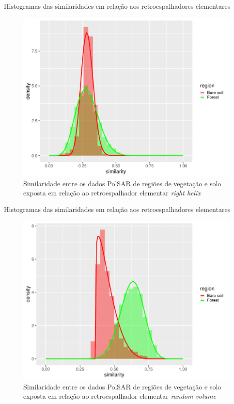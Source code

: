 \documentclass[10pt]{beamer}
\begin{document}
\begin{frame}{Histogramas das similaridades em relação aos retroespalhadores elementares}

\begin{figure}
    \centering
    \includegraphics[width = .6\linewidth]{rh.pdf}
    \caption{Similaridade entre os dados PolSAR de regiões de vegetação e solo exposta em relação ao retroespalhador elementar \textit{right helix}}
    \label{fig:rh}
\end{figure}
    
\end{frame}

\begin{frame}{Histogramas das similaridades em relação aos retroespalhadores elementares}

\begin{figure}
    \centering
    \includegraphics[width = .6\linewidth]{rv.pdf}
    \caption{Similaridade entre os dados PolSAR de regiões de vegetação e solo exposta em relação ao retroespalhador elementar \textit{random volume}}
    \label{fig:rv}
\end{figure}
    
\end{frame}
\end{document}
